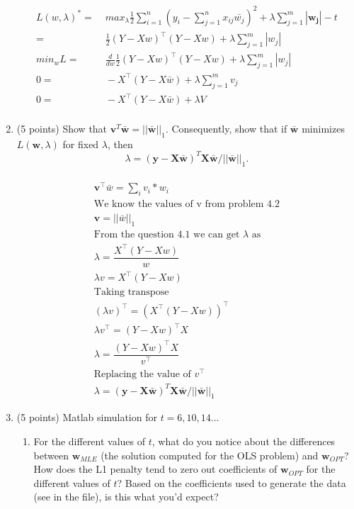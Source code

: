 \documentclass[english]{article}
\begin{document}
\begin{enumerate}
\begin{align*}
		L(w,\lambda)^* =&\; max_{\lambda} \frac{1}{2} \sum\limits_{i=1}^n \left( y_i - \sum_{j=1}^n x_{ij} \bar{w_j} \right) ^2 + \lambda \sum_{j=1}^m |\mathbf{w_j}| -t \\
		=&\; \frac{1}{2} (Y - Xw)^\top (Y - Xw) + \lambda \sum\limits_{j=1}^m |w_j| \\
		min_w L =&\; \frac{d}{dw} \frac{1}{2} (Y - Xw)^\top (Y - Xw) + \lambda \sum\limits_{j=1}^m |w_j| \\
		0 = &\; -X^\top (Y - X\bar{w}) + \lambda \sum\limits_{j=1}^m v_j \\
		0 = &\;  -X^\top (Y - X\bar{w}) + \lambda V \\
\end{align*}

\item (5 points) Show that $\mathbf{v}^T\bar{\mathbf{w}} = ||\bar{\mathbf{w}}||_1$. Consequently, show that if $\bar{\mathbf{w}}$ minimizes $L(\mathbf{w}, \lambda)$ for fixed $\lambda$, then 
\begin{equation}\label{wlambdarelation}
\lambda = (\mathbf{y}-\mathbf{X}\bar{\mathbf{w}})^T\mathbf{X}\bar{\mathbf{w}}/||\bar{\mathbf{w}}||_1.
\end{equation}\\

\begin{align*}
	\mathbf{v}^\top \bar{w} = \sum_{i} v_i * w_i \\
	\text{We know the values of v from problem 4.2} \\
	\mathbf{v} = ||\bar{w}||_1 \\
	\text{From the question 4.1 we can get $\lambda$ as} \\
	\lambda = \dfrac{X^\top (Y - Xw)}
			      {w}\\
	\lambda v = X^\top (Y - Xw) \\
	\text{Taking transpose} \\
	(\lambda v)^\top = (X^\top (Y - Xw)) ^\top \\
	\lambda v^\top = (Y - Xw)^\top X \\
	\lambda = \dfrac{ (Y - Xw)^\top X} {v^\top}\\
	\text{Replacing the value of $v^\top$}\\
	\lambda = (\mathbf{y}-\mathbf{X}\bar{\mathbf{w}})^T\mathbf{X}\bar{\mathbf{w}}/||\bar{\mathbf{w}}||_1
\end{align*}

\item (5 points) Matlab simulation for $t=6,10,14$...
	\begin{enumerate}
	\item For the different values of $t$, what do you notice about the differences between $\mathbf{w}_{MLE}$ (the solution computed for the OLS problem) and $\mathbf{w}_{OPT}$? How does the L1 penalty tend to zero out coefficients of $\mathbf{w}_{OPT}$ for the different values of $t$? Based on the coefficients used to generate the data (see in the file), is this what you'd expect?  \\
	

\end{enumerate}
\end{enumerate}
\end{document}
